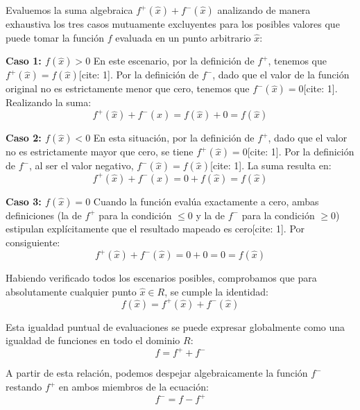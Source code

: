 \documentclass[11pt,letterpaper]{article}
\begin{document}
Evaluemos la suma algebraica $f^{+}(\hat{x}) + f^{-}(\hat{x})$ analizando de manera exhaustiva los tres casos mutuamente excluyentes para los posibles valores que puede tomar la función $f$ evaluada en un punto arbitrario $\hat{x}$:

\textbf{Caso 1: $f(\hat{x}) > 0$}
En este escenario, por la definición de $f^{+}$, tenemos que $f^{+}(\hat{x}) = f(\hat{x})$[cite: 1]. Por la definición de $f^{-}$, dado que el valor de la función original no es estrictamente menor que cero, tenemos que $f^{-}(\hat{x}) = 0$[cite: 1]. Realizando la suma:
\begin{equation*}
f^{+}(\hat{x}) + f^{-}(\hat{x}) = f(\hat{x}) + 0 = f(\hat{x})
\end{equation*}

\textbf{Caso 2: $f(\hat{x}) < 0$}
En esta situación, por la definición de $f^{+}$, dado que el valor no es estrictamente mayor que cero, se tiene $f^{+}(\hat{x}) = 0$[cite: 1]. Por la definición de $f^{-}$, al ser el valor negativo, $f^{-}(\hat{x}) = f(\hat{x})$[cite: 1]. La suma resulta en:
\begin{equation*}
f^{+}(\hat{x}) + f^{-}(\hat{x}) = 0 + f(\hat{x}) = f(\hat{x})
\end{equation*}

\textbf{Caso 3: $f(\hat{x}) = 0$}
Cuando la función evalúa exactamente a cero, ambas definiciones (la de $f^{+}$ para la condición $\le 0$ y la de $f^{-}$ para la condición $\ge 0$) estipulan explícitamente que el resultado mapeado es cero[cite: 1]. Por consiguiente:
\begin{equation*}
f^{+}(\hat{x}) + f^{-}(\hat{x}) = 0 + 0 = 0 = f(\hat{x})
\end{equation*}

Habiendo verificado todos los escenarios posibles, comprobamos que para absolutamente cualquier punto $\hat{x} \in R$, se cumple la identidad:
\begin{equation*}
f(\hat{x}) = f^{+}(\hat{x}) + f^{-}(\hat{x})
\end{equation*}

Esta igualdad puntual de evaluaciones se puede expresar globalmente como una igualdad de funciones en todo el dominio $R$:
\begin{equation*}
f = f^{+} + f^{-}
\end{equation*}

A partir de esta relación, podemos despejar algebraicamente la función $f^{-}$ restando $f^{+}$ en ambos miembros de la ecuación:
\begin{equation*}
f^{-} = f - f^{+}
\end{equation*}
\end{document}
